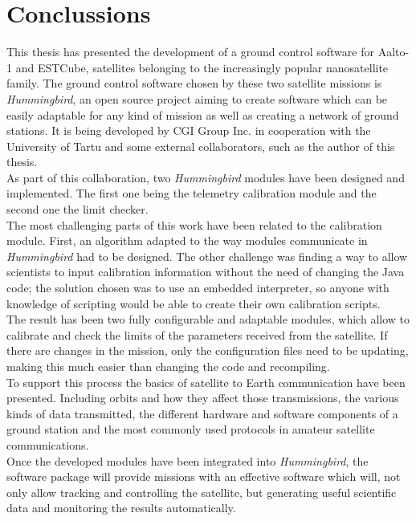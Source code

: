 \chapter{Conclussions}

This thesis has presented the development of a ground control software for Aalto-1 and ESTCube, satellites belonging to the increasingly popular nanosatellite family. The ground control software chosen by these two satellite missions is \emph{Hummingbird}, an open source project aiming to create software which can be easily adaptable for any kind of mission as well as creating a network of ground stations. It is being developed by CGI Group Inc. in cooperation with the University of Tartu and some external collaborators, such as the author of this thesis.\\ 


As part of this collaboration, two \emph{Hummingbird} modules have been designed and implemented. The first one being the telemetry calibration module and the second one the limit checker.\\

The most challenging parts of this work have been related to the calibration module. First, an algorithm adapted to the way modules communicate in \emph{Hummingbird} had to be designed. The other challenge was finding a way to allow scientists to input calibration information without the need of changing the Java code; the solution chosen was to use an embedded  interpreter, so anyone with knowledge of scripting would be able to create their own calibration scripts.\\

The result has been two fully configurable and adaptable modules, which allow to calibrate and check the limits of the parameters received from the satellite. If there are changes in the mission, only the configuration files need to be updating, making this much easier than changing the code and recompiling.\\

To support this process the basics of satellite to Earth communication have been presented. Including orbits and how they affect those transmissions, the various kinds of data transmitted, the different hardware and software components of a ground station and the most commonly used protocols in amateur satellite communications.\\

Once the developed modules have been integrated into \emph{Hummingbird}, the software package will provide missions with an effective software which will, not only allow tracking and controlling the satellite, but generating useful scientific data and monitoring the results automatically.\\


\newpage